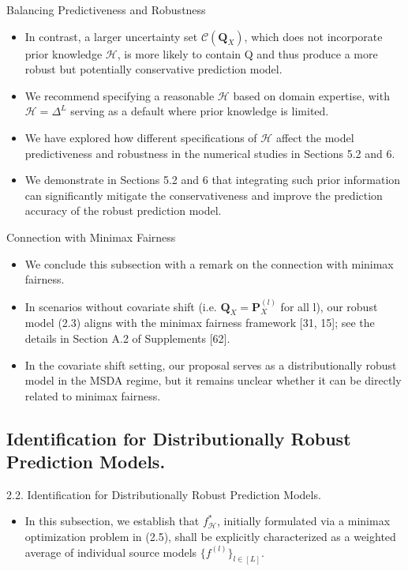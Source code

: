 \documentclass{beamer}
\begin{document}
\begin{frame}{Balancing Predictiveness and Robustness}
    \begin{itemize}
        \item In contrast, a larger uncertainty set $\mathcal{C}(\mathbf{Q}_{X})$, which does not incorporate prior knowledge $\mathcal{H}$, is more likely to contain Q and thus produce a more robust but potentially conservative prediction model.
        \item We recommend specifying a reasonable $\mathcal{H}$ based on domain expertise, with $\mathcal{H} = \Delta^{L}$ serving as a default where prior knowledge is limited.
        \item We have explored how different specifications of $\mathcal{H}$ affect the model predictiveness and robustness in the numerical studies in Sections 5.2 and 6.
        \item We demonstrate in Sections 5.2 and 6 that integrating such prior information can significantly mitigate the conservativeness and improve the prediction accuracy of the robust prediction model.
    \end{itemize}
\end{frame}

\begin{frame}{Connection with Minimax Fairness}
    \begin{itemize}
        \item We conclude this subsection with a remark on the connection with minimax fairness.
        \item In scenarios without covariate shift (i.e. $\mathbf{Q}_{X} = \mathbf{P}_{X}^{(l)}$ for all l), our robust model (2.3) aligns with the minimax fairness framework [31, 15]; see the details in Section A.2 of Supplements [62].
        \item In the covariate shift setting, our proposal serves as a distributionally robust model in the MSDA regime, but it remains unclear whether it can be directly related to minimax fairness.
    \end{itemize}
\end{frame}

\subsection{Identification for Distributionally Robust Prediction Models.}
\begin{frame}{2.2. Identification for Distributionally Robust Prediction Models.}
    \begin{itemize}
        \item In this subsection, we establish that $f_{\mathcal{H}}^{*}$, initially formulated via a minimax optimization problem in (2.5), shall be explicitly characterized as a weighted average of individual source models $\{ f^{(l)} \}_{l \in [L]}$.
    \end{itemize}
\end{frame}
\end{document}
